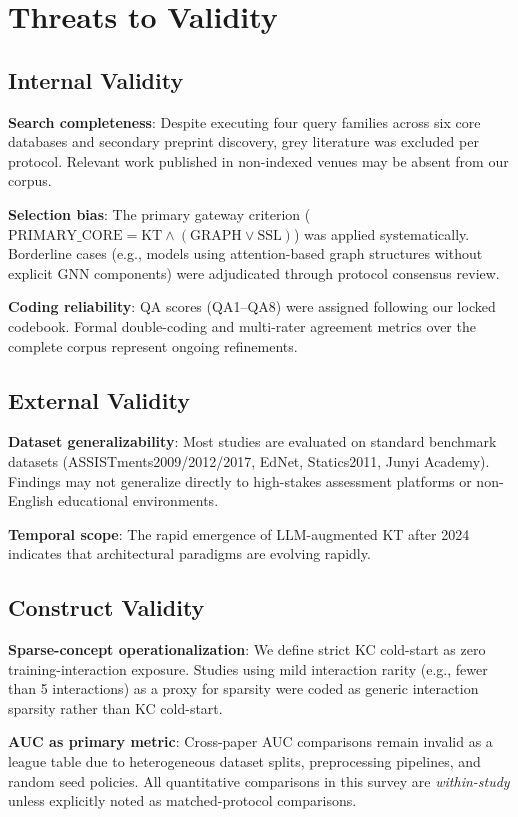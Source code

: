 \documentclass[10pt,journal,compsoc]{IEEEtran}
\begin{document}
\section{Threats to Validity}

\subsection{Internal Validity}
\textbf{Search completeness}: Despite executing four query families across six core databases and secondary preprint discovery, grey literature was excluded per protocol. Relevant work published in non-indexed venues may be absent from our corpus.

\textbf{Selection bias}: The primary gateway criterion ($\text{PRIMARY\_CORE} = \text{KT} \land (\text{GRAPH} \lor \text{SSL})$) was applied systematically. Borderline cases (e.g., models using attention-based graph structures without explicit GNN components) were adjudicated through protocol consensus review.

\textbf{Coding reliability}: QA scores (QA1--QA8) were assigned following our locked codebook. Formal double-coding and multi-rater agreement metrics over the complete corpus represent ongoing refinements.

\subsection{External Validity}
\textbf{Dataset generalizability}: Most studies are evaluated on standard benchmark datasets (ASSISTments2009/2012/2017, EdNet, Statics2011, Junyi Academy). Findings may not generalize directly to high-stakes assessment platforms or non-English educational environments.

\textbf{Temporal scope}: The rapid emergence of LLM-augmented KT after 2024 indicates that architectural paradigms are evolving rapidly.

\subsection{Construct Validity}
\textbf{Sparse-concept operationalization}: We define strict KC cold-start as zero training-interaction exposure. Studies using mild interaction rarity (e.g., fewer than 5 interactions) as a proxy for sparsity were coded as generic interaction sparsity rather than KC cold-start.

\textbf{AUC as primary metric}: Cross-paper AUC comparisons remain invalid as a league table due to heterogeneous dataset splits, preprocessing pipelines, and random seed policies. All quantitative comparisons in this survey are \textit{within-study} unless explicitly noted as matched-protocol comparisons.
\end{document}
